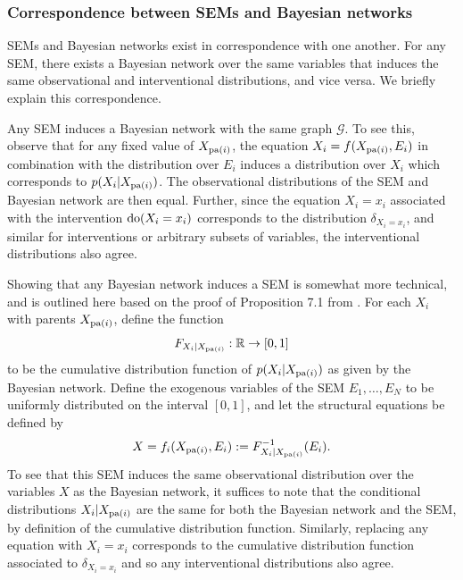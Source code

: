 \subsubsection{Correspondence between SEMs and Bayesian networks} 
SEMs and Bayesian networks exist in correspondence with one another. 
For any SEM, there exists a Bayesian network over the same variables that induces the same observational and interventional distributions, and vice versa.
We briefly explain this correspondence.

Any SEM induces a Bayesian network with the same graph $\mathcal{G}$.
To see this, observe that for any fixed value of $X_{\operatorname{pa}(i)}$, the equation $X_i = f(X_{\operatorname{pa}(i)} , E_i)$ in combination with the distribution over $E_i$ induces a distribution over $X_i$ which corresponds to $p(X_i | X_{\operatorname{pa}(i)})$. The observational distributions of the SEM and Bayesian network are then equal. Further, since the equation $X_i=x_i$ associated with the intervention $\operatorname{do}(X_i = x_i)$ corresponds to the distribution $\delta_{X_i = x_i}$, and similar for interventions or arbitrary subsets of variables, the interventional distributions also agree.

Showing that any Bayesian network induces a SEM is somewhat more technical, and is outlined here based on the proof of Proposition 7.1 from \cite{peters2017elements}. 
For each $X_i$ with parents $X_{\operatorname{pa}(i)}$, define the function
%
\begin{align*}
F_{X_i|X_{\operatorname{pa}(i)}}:\mathbb{R} \to [0,1]
\end{align*}
%
to be the cumulative distribution function of $p(X_i|X_{\operatorname{pa}(i)})$ as given by the Bayesian network.
Define the exogenous variables of the SEM $E_1, \ldots, E_N$ to be uniformly distributed on the interval $[0,1]$, and let the structural equations be defined by
%
\begin{align*}
X = f_i(X_{\operatorname{pa}(i)}, E_i) := F^{-1}_{X_i|X_{\operatorname{pa}(i)}}(E_i).
\end{align*}
%
To see that this SEM induces the same observational distribution over the variables $X$ as the Bayesian network, it suffices to note that the conditional distributions $X_i|X_{\operatorname{pa}(i)}$ are the same for both the Bayesian network and the SEM, by definition of the cumulative distribution function.
Similarly, replacing any equation with $X_i=x_i$ corresponds to the cumulative distribution function associated to $\delta_{X_i=x_i}$ and so any interventional distributions also agree.




